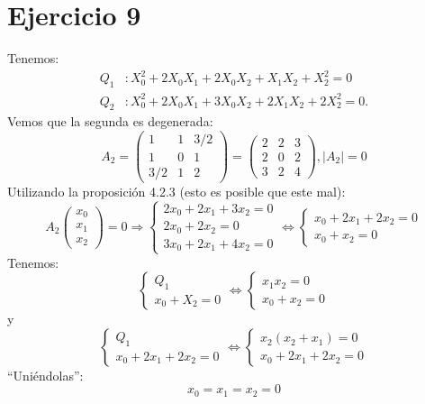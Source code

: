 \documentclass[10pt,a4paper,openright]{book}
\theoremstyle{break}
\begin{document}
\section{Ejercicio 9}%
\label{sec:ejercicio_9_4}
Tenemos: 
\begin{align*}
    Q_1 &: X_0^2 + 2X_0X_1 + 2X_0X_2 + X_1X_2 + X_2^2 = 0\\
    Q_2 &: X_0^2 + 2X_0X_1 + 3X_0X_2 + 2X_1X_2 + 2X_2^2 = 0
.\end{align*}
Vemos que la segunda es degenerada:
\[
    A_2 = \begin{pmatrix} 1 & 1 & 3/2\\ 1 & 0 & 1\\ 3/2 & 1 & 2 \end{pmatrix} = \begin{pmatrix} 2 & 2 & 3\\ 2 & 0 & 2\\ 3 & 2 & 4 \end{pmatrix}, \mid A_2\mid = 0
\]
Utilizando la proposición 4.2.3 (esto es posible que este mal):
\[
A_2\begin{pmatrix} x_0\\ x_1\\ x_2 \end{pmatrix} = 0 \Rightarrow \begin{cases}
    2x_0 + 2x_1 + 3x_2 = 0\\
    2x_0 + 2x_2 = 0\\
    3x_0 + 2x_1 + 4x_2 = 0
\end{cases} \Leftrightarrow \begin{cases}
    x_0 + 2x_1 + 2x_2 = 0\\
    x_0 + x_2 = 0
\end{cases} 
\]
Tenemos: 
\[
\begin{cases}
    Q_1\\
    x_0 + X_2 = 0
\end{cases} \Leftrightarrow
\begin{cases}
    x_1x_2 = 0\\
    x_0 + x_2 = 0
\end{cases} 
\]
y 
\[
\begin{cases}
    Q_1\\
    x_0 + 2x_1 + 2x_2 = 0
\end{cases} \Leftrightarrow
\begin{cases}
    x_2\left( x_2 + x_1 \right) = 0\\
    x_0 + 2x_1 + 2x_2 = 0
\end{cases} 
\]
``Uniéndolas'': 
\[
    x_0 = x_1 = x_2 = 0 
\]
\end{document}

